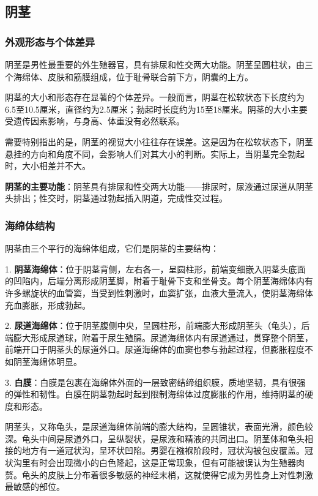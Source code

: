 \subsection{阴茎}

\subsubsection{外观形态与个体差异}

阴茎是男性最重要的外生殖器官，具有排尿和性交两大功能。阴茎呈圆柱状，由三个海绵体、皮肤和筋膜组成，位于耻骨联合前下方，阴囊的上方。

阴茎的大小和形态存在显著的个体差异。一般而言，阴茎在松软状态下长度约为6.5至10.5厘米，直径约为2.5厘米；勃起时长度约为15至18厘米。阴茎的大小主要受遗传因素影响，与身高、体重没有必然联系。

需要特别指出的是，阴茎的视觉大小往往存在误差。这是因为在松软状态下，阴茎悬挂的方向和角度不同，会影响人们对其大小的判断。实际上，当阴茎完全勃起时，大小相差并不大。

\textbf{阴茎的主要功能}：阴茎具有排尿和性交两大功能——排尿时，尿液通过尿道从阴茎头排出；性交时，阴茎通过勃起插入阴道，完成性交过程。

\subsubsection{海绵体结构}

阴茎由三个平行的海绵体组成，它们是阴茎的主要结构：

1. \textbf{阴茎海绵体}：位于阴茎背侧，左右各一，呈圆柱形，前端变细嵌入阴茎头底面的凹陷内，后端分离形成阴茎脚，附着于耻骨下支和坐骨支。每个阴茎海绵体内有许多螺旋状的血管窦，当受到性刺激时，血窦扩张，血液大量流入，使阴茎海绵体充血膨胀，形成勃起。

2. \textbf{尿道海绵体}：位于阴茎腹侧中央，呈圆柱形，前端膨大形成阴茎头（龟头），后端膨大形成尿道球，附着于尿生殖膈。尿道海绵体内有尿道通过，贯穿整个阴茎，前端开口于阴茎头的尿道外口。尿道海绵体的血窦也参与勃起过程，但膨胀程度不如阴茎海绵体明显。

3. \textbf{白膜}：白膜是包裹在海绵体外面的一层致密结缔组织膜，质地坚韧，具有很强的弹性和韧性。白膜在阴茎勃起时起到限制海绵体过度膨胀的作用，维持阴茎的硬度和形态。

阴茎头，又称龟头，是尿道海绵体前端的膨大结构，呈圆锥状，表面光滑，颜色较深。龟头中间是尿道外口，呈纵裂状，是尿液和精液的共同出口。阴茎体和龟头相接的地方有一道冠状沟，呈环状凹陷。男婴在襁褓阶段时，冠状沟被包皮覆盖。冠状沟里有时会出现微小的白色隆起，这是正常现象，但有可能被误认为生殖器肉赘。龟头的皮肤上分布着很多敏感的神经末梢，这就使得它成为男性身上对性刺激最敏感的部位。

